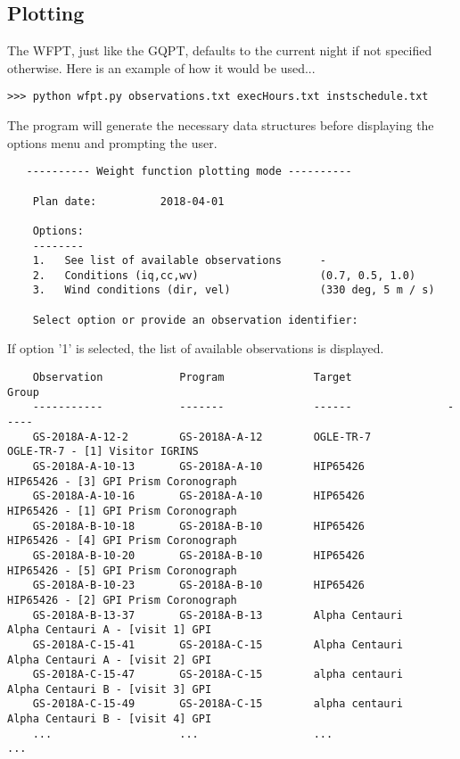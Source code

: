 \documentclass{article}
\begin{document}
\subsection{Plotting}
\label{sec:wfptplotting}
The WFPT, just like the GQPT, defaults to the current night if not specified otherwise.  Here is an example of how it would be used...
\begin{lstlisting}
>>> python wfpt.py observations.txt execHours.txt instschedule.txt
\end{lstlisting}

The program will generate the necessary data structures before displaying the options menu and prompting the user.
\begin{lstlisting}
   ---------- Weight function plotting mode ----------

	Plan date:          2018-04-01

	Options:
	--------
	1.   See list of available observations      -                                       
	2.   Conditions (iq,cc,wv)                   (0.7, 0.5, 1.0)                         
	3.   Wind conditions (dir, vel)              (330 deg, 5 m / s)       

	Select option or provide an observation identifier:
\end{lstlisting}

If option '1' is selected, the list of available observations is displayed.
\begin{lstlisting}
	Observation            Program              Target               Group                                   
	-----------            -------              ------               -----                                   
	GS-2018A-A-12-2        GS-2018A-A-12        OGLE-TR-7            OGLE-TR-7 - [1] Visitor IGRINS          
	GS-2018A-A-10-13       GS-2018A-A-10        HIP65426             HIP65426 - [3] GPI Prism Coronograph
	GS-2018A-A-10-16       GS-2018A-A-10        HIP65426             HIP65426 - [1] GPI Prism Coronograph
	GS-2018A-B-10-18       GS-2018A-B-10        HIP65426             HIP65426 - [4] GPI Prism Coronograph
	GS-2018A-B-10-20       GS-2018A-B-10        HIP65426             HIP65426 - [5] GPI Prism Coronograph
	GS-2018A-B-10-23       GS-2018A-B-10        HIP65426             HIP65426 - [2] GPI Prism Coronograph
	GS-2018A-B-13-37       GS-2018A-B-13        Alpha Centauri       Alpha Centauri A - [visit 1] GPI
	GS-2018A-C-15-41       GS-2018A-C-15        Alpha Centauri       Alpha Centauri A - [visit 2] GPI
	GS-2018A-C-15-47       GS-2018A-C-15        alpha centauri       Alpha Centauri B - [visit 3] GPI
	GS-2018A-C-15-49       GS-2018A-C-15        alpha centauri       Alpha Centauri B - [visit 4] GPI
	...                    ...                  ...                  ...
\end{lstlisting}
\end{document}
